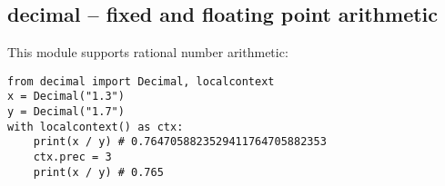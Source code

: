 \subsection{decimal -- fixed and floating point arithmetic}
This module supports rational number arithmetic:
\begin{verbatim}
from decimal import Decimal, localcontext
x = Decimal("1.3")
y = Decimal("1.7")
with localcontext() as ctx:
    print(x / y) # 0.7647058823529411764705882353
    ctx.prec = 3
    print(x / y) # 0.765
\end{verbatim}
